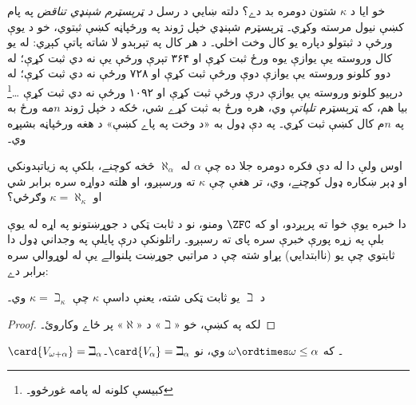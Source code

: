 \documentclass[../../../include/open-logic-section]{subfiles}
\begin{document}
خو ايا د $\kappa$ شتون دومره بد دے؟ دلته ښايي د رسل
\emph{د ټرېسټرم شېنډي تناقض} په پام کښې نيول مرسته وکړي۔
ټرېسټرم شېنډي خپل ژوند په ورځپاڼه کښې ثبتوي، خو د يوې
ورځې د ثبتولو دپاره يو کال وخت اخلي۔ د هر کال په تېرېدو
لا شاته پاتې کېږي: له يو کال وروسته يې يوازې يوه ورځ
ثبت کړې او ۳۶۴ تېرې ورځې يې نه دي ثبت کړې؛ له دوو کلونو
وروسته يې يوازې دوې ورځې ثبت کړې او ۷۲۸ ورځې نه دي ثبت
کړې؛ له درېيو کلونو وروسته يې يوازې درې ورځې ثبت کړې
او ۱۰۹۲ ورځې نه دي ثبت کړې \dots\footnote{کبيسې کلونه
له پامه غورځوو۔} بيا هم، که ټرېسټرم \emph{تلپاتې} وي،
هره ورځ به ثبت کړے شي، ځکه د خپل ژوند $n$مه ورځ
به په $n$م کال کښې ثبت کړي۔ په دې ډول به «د وخت په پاے
کښې» د هغه ورځپاڼه بشپړه وي۔

اوس ولې دا له دې فکره دومره جلا ده چې $\alpha$ له
$\aleph_\alpha$ څخه کوچنے، بلکې په زياتېدونکي او ډېر
ښکاره ډول کوچنے، وي، تر هغې چې $\kappa$ ته ورسېږو،
او هلته دواړه سره برابر شي او $\kappa
= \aleph_\kappa$ وګرځي؟

دا خبره يوې خوا ته پرېږدو، او که $\ZFC$ ومنو، نو د
ثابت ټکي د جوړښتونو په اړه له يوې بلې په زړه پورې
خبرې سره پای ته رسېږو۔ راتلونکې درې پايلې په وجداني
ډول دا ثابتوي چې يو (ناابتدايي) پړاو شته چې د مراتبي
جوړښت پلنوالے يې له لوړوالي سره برابر دے:

\begin{prop}
د $\beth$ يو ثابت ټکی شته، يعنې داسې $\kappa$ چې
$\kappa=\beth_\kappa$ وي۔
\end{prop}

\begin{proof}
لکه په  کښې، خو «$\beth$» د
«$\aleph$» پر ځاے وکاروئ۔
\end{proof}

\begin{prop}
$\card{V_{\omega+\alpha}} = \beth_{\alpha}$۔ که
$\omega \ordtimes \omega \leq \alpha$ وي، نو
$\card{V_\alpha} = \beth_\alpha$۔
\end{prop}
\end{document}
